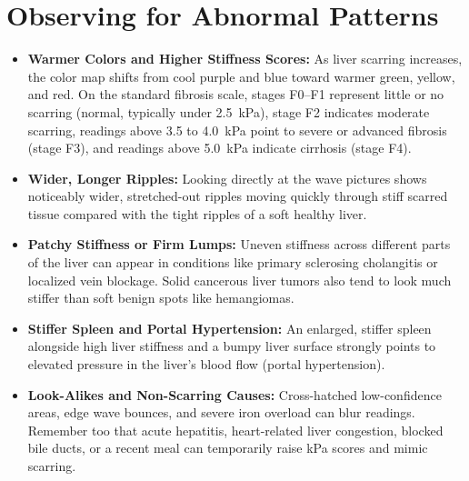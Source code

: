 \section{Observing for Abnormal Patterns}
\begin{itemize}
\item \textbf{Warmer Colors and Higher Stiffness Scores:} As liver scarring increases, the color map shifts from cool purple and blue toward warmer green, yellow, and red. On the standard fibrosis scale, stages F0--F1 represent little or no scarring (normal, typically under 2.5~kPa), stage F2 indicates moderate scarring, readings above 3.5 to 4.0~kPa point to severe or advanced fibrosis (stage F3), and readings above 5.0~kPa indicate cirrhosis (stage F4).
\item \textbf{Wider, Longer Ripples:} Looking directly at the wave pictures shows noticeably wider, stretched-out ripples moving quickly through stiff scarred tissue compared with the tight ripples of a soft healthy liver.
\item \textbf{Patchy Stiffness or Firm Lumps:} Uneven stiffness across different parts of the liver can appear in conditions like primary sclerosing cholangitis or localized vein blockage. Solid cancerous liver tumors also tend to look much stiffer than soft benign spots like hemangiomas.
\item \textbf{Stiffer Spleen and Portal Hypertension:} An enlarged, stiffer spleen alongside high liver stiffness and a bumpy liver surface strongly points to elevated pressure in the liver's blood flow (portal hypertension).
\item \textbf{Look-Alikes and Non-Scarring Causes:} Cross-hatched low-confidence areas, edge wave bounces, and severe iron overload can blur readings. Remember too that acute hepatitis, heart-related liver congestion, blocked bile ducts, or a recent meal can temporarily raise kPa scores and mimic scarring.
\end{itemize}

